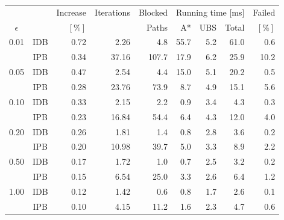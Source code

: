 \begin{tabular}{ccrrrrrrr}
\toprule
            & & Increase & Iterations & Blocked & \multicolumn{3}{c}{Running time [ms]} & Failed \\ \cmidrule(lr){6-8}
 $\epsilon$ & &   $[\%]$ &            &   Paths & A* & UBS & Total                      & $[\%]$ \\
\midrule
\multirow{2}{*}{0.01} & IDB &                     0.72 &            2.26 &                  4.8 &                       55.7 &                5.2 &             61.0 &     0.6 \\
                      & IPB &                     0.34 &           37.16 &                107.7 &                       17.9 &                6.2 &             25.9 &    10.2 \\[2pt]
\multirow{2}{*}{0.05} & IDB &                     0.47 &            2.54 &                  4.4 &                       15.0 &                5.1 &             20.2 &     0.5 \\
                      & IPB &                     0.28 &           23.76 &                 73.9 &                        8.7 &                4.9 &             15.1 &     5.6 \\[2pt]
\multirow{2}{*}{0.10} & IDB &                     0.33 &            2.15 &                  2.2 &                        0.9 &                3.4 &              4.3 &     0.3 \\
                      & IPB &                     0.23 &           16.84 &                 54.4 &                        6.4 &                4.3 &             12.0 &     4.0 \\[2pt]
\multirow{2}{*}{0.20} & IDB &                     0.26 &            1.81 &                  1.4 &                        0.8 &                2.8 &              3.6 &     0.2 \\
                      & IPB &                     0.20 &           10.98 &                 39.7 &                        5.0 &                3.3 &              8.9 &     2.2 \\[2pt]
\multirow{2}{*}{0.50} & IDB &                     0.17 &            1.72 &                  1.0 &                        0.7 &                2.5 &              3.2 &     0.2 \\
                      & IPB &                     0.15 &            6.54 &                 25.0 &                        3.3 &                2.6 &              6.4 &     1.2 \\[2pt]
\multirow{2}{*}{1.00} & IDB &                     0.12 &            1.42 &                  0.6 &                        0.8 &                1.7 &              2.6 &     0.1 \\
                      & IPB &                     0.10 &            4.15 &                 11.2 &                        1.6 &                2.3 &              4.7 &     0.6 \\
\bottomrule
\end{tabular}


